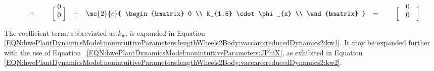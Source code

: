 \documentclass[crop=false,float=true,class=scrreprt]{standalone}
\begin{document}
\begin{landscape}
\begin{equation}
\begin{array}{ccccccccccc}
{}
& + &
&
\hphantom{\cdot}
\begin{bmatrix}
\hphantom{\dot{\phi_{x}}}\\[-2em]
0\\
0\\
\end{bmatrix}
& + &
\mc{2}{c}{
\begin{bmatrix}
0                      \\
k_{1.5} \cdot \phi_{x} \\
\end{bmatrix}
}
& = &
&
\hphantom{\cdot}
\begin{bmatrix}
\hphantom{v_{mtr.r}}\\[-2em]
0\\
0\\
\end{bmatrix}
\end{array}
\end{equation}

\vspace*{\fill}

\end{landscape}




\clearpage




The coefficient term, abbreviated as $k_{w}$, is expanded in Equation~%
\eqref{EQN:hwePlantDynamicsModel:nonintuitiveParameters:lengthWheels2Body:vaccaro:reducedDynamics2:kw1}.
It may be expanded further with the use of Equation~%
\eqref{EQN:hwePlantDynamicsModel:nonintuitiveParameters:JPhiX},
as exhibited in Equation~%
\eqref{EQN:hwePlantDynamicsModel:nonintuitiveParameters:lengthWheels2Body:vaccaro:reducedDynamics2:kw2}.


\vspace{-1em}
\end{document}
